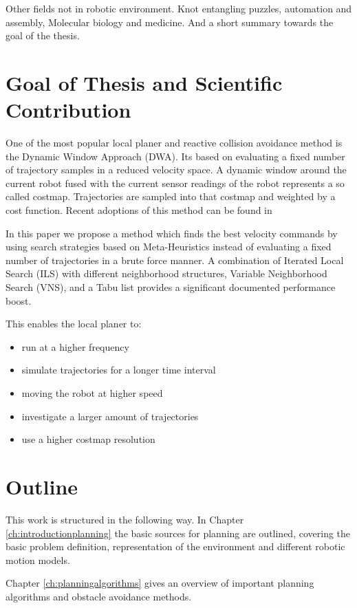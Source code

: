 Other fields not in robotic environment. Knot entangling puzzles, automation and assembly, Molecular biology and medicine.
And a short summary towards the goal of the thesis.

\section{Goal of Thesis and Scientific Contribution}\label{sec:goal}


One of the most popular local planer and reactive collision avoidance method is the Dynamic Window Approach (DWA)\cite{DWA1997}. Its based on evaluating a fixed number of trajectory samples in a reduced velocity space. 
A dynamic window around the current robot fused with the current sensor readings of the robot represents a so called costmap.
Trajectories are sampled into that costmap and weighted by a cost function.
Recent adoptions of this method can be found in \cite{conf/icra/SederP07}\cite{DBLP:conf/icra/Marder-EppsteinBFGK10}

In this paper we propose a method which finds the best velocity commands by using search strategies based on Meta-Heuristics instead of evaluating a fixed number of trajectories in a brute force manner.
A combination of Iterated Local Search (ILS) with different neighborhood structures, Variable Neighborhood Search (VNS), and a Tabu list provides a significant documented performance boost. 

This enables the local planer to:
\begin{itemize}
\item run at a higher frequency
\item simulate trajectories for a longer time interval
\item moving the robot at higher speed
\item investigate a larger amount of trajectories
\item use a higher costmap resolution
\end{itemize}

\section{Outline}\label{sec:outline}
This work is structured in the following way. 
In Chapter \ref{ch:introductionplanning} the basic sources for planning are outlined, covering the basic problem definition, representation of the environment and different robotic motion models. 

Chapter \ref{ch:planningalgorithms} gives an overview of important planning algorithms and obstacle avoidance methods.
 
